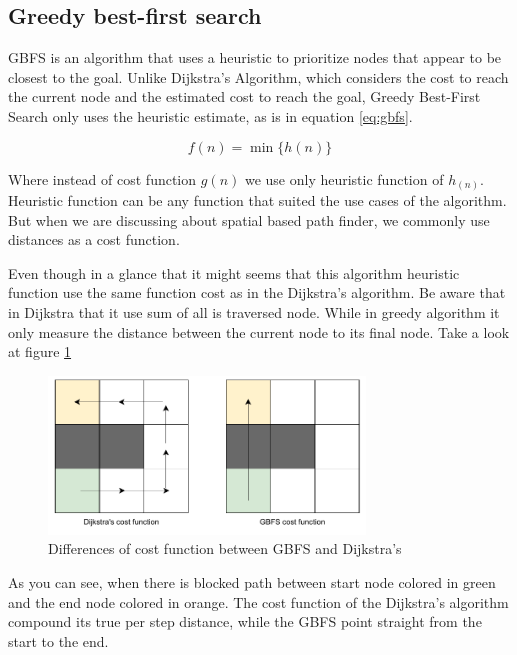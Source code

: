 \documentclass[12pt]{report}
\begin{document}
        \subsection{Greedy best-first search}
        \ac{GBFS} is an algorithm that uses a heuristic to prioritize nodes that appear to be closest to
        the goal. Unlike Dijkstra's Algorithm, which considers the cost to reach the current node and the estimated cost
        to reach the goal, Greedy Best-First Search only uses the heuristic estimate, as is in equation \ref{eq:gbfs}.

        \begin{equation}\label{eq:gbfs}
            f(n) = \min_{} \{ h(n)\}
        \end{equation}

        Where instead of cost function \(g(n)\) we use only heuristic function of \(h_(n)\). Heuristic function can be
        any function that suited the use cases of the algorithm. But when we are discussing about spatial based path
        finder, we commonly use distances as a cost function. 

        Even though in a glance that it might seems that this algorithm heuristic function use the same function cost as
        in the Dijkstra's algorithm. Be aware that in Dijkstra that it use sum of all is traversed node. While in greedy
        algorithm it only measure the distance between the current node to its final node. Take a look at figure
        \ref{fig:greedybfs}

        \begin{figure}[H]
            \centering
            \includegraphics[width=0.75\textwidth]{General Image/OSM Drone-gbfs vs dijkstra.pdf}
            \caption{Differences of cost function between GBFS and Dijkstra's}
            \label{fig:greedybfs}
        \end{figure}

        As you can see, when there is blocked path between start node colored in green and the end node colored in orange.
        The cost function of the Dijkstra's algorithm compound its true per step distance, while the GBFS point straight
        from the start to the end. 
        
\end{document}
